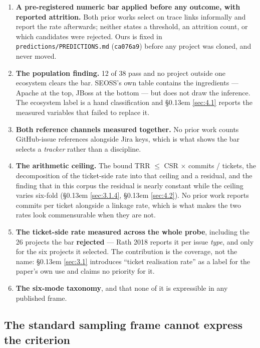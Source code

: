 \documentclass[11pt,a4paper]{article}
\begin{document}
\begin{enumerate}
\item \textbf{A pre-registered numeric bar applied before any outcome, with reported attrition.} Both prior works select on trace links informally and report the rate afterwards; neither states a threshold, an attrition count, or which candidates were rejected. Ours is fixed in \texttt{predictions/\allowbreak{}PREDICTIONS.\allowbreak{}md} (\texttt{ca076a9}) before any project was cloned, and never moved.
\item \textbf{The population finding.} 12 of 38 pass and no project outside one ecosystem clears the bar. SEOSS's own table contains the ingredients --- Apache at the top, JBoss at the bottom --- but does not draw the inference. The ecosystem label is a hand classification and \S\kern0.13em \ref{sec:4.1} reports the measured variables that failed to replace it.
\item \textbf{Both reference channels measured together.} No prior work counts GitHub-issue references alongside Jira keys, which is what shows the bar selects a \emph{tracker} rather than a discipline.
\item \textbf{The arithmetic ceiling.} The bound TRR $\leq$ CSR $\times$ commits / tickets, the decomposition of the ticket-side rate into that ceiling and a residual, and the finding that in this corpus the residual is nearly constant while the ceiling varies six-fold (\S\kern0.13em \ref{sec:3.1.4}, \S\kern0.13em \ref{sec:4.2}). No prior work reports commits per ticket alongside a linkage rate, which is what makes the two rates look commensurable when they are not.
\item \textbf{The ticket-side rate measured across the whole probe}, including the 26 projects the bar \textbf{rejected} --- Rath 2018 reports it per issue \emph{type}, and only for the six projects it selected. The contribution is the coverage, not the name: \S\kern0.13em \ref{sec:3.1} introduces ``ticket realisation rate'' as a label for the paper's own use and claims no priority for it.
\item \textbf{The six-mode taxonomy}, and that none of it is expressible in any published frame.
\end{enumerate}

\subsection{The standard sampling frame cannot express the criterion}
\label{sec:2.3}
\end{document}
